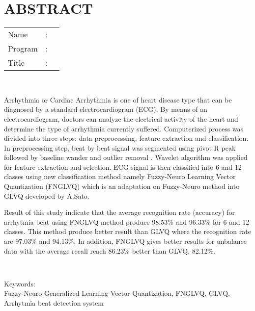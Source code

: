 %
%
%

\chapter*{ABSTRACT}

\vspace*{0.2cm}

\noindent \begin{tabular}{l l p{11.0cm}}
	Name&: & \penulis \\
	Program&: & \programstudi \\
	Title&: & \judulInggris \\
\end{tabular} \\ 

\vspace*{0.5cm}

\noindent
Arrhythmia or Cardiac Arrhythmia is one of heart
disease type that can be diagnosed by a standard electrocardiogram (ECG). By
means of an electrocardiogram, doctors can analyze the electrical activity of
the heart and determine the type of arrhythmia currently suffered. Computerized
process was divided into three steps: data preprocessing, feature extraction and
classification. In preprocessing step, beat by beat signal was segmented using
pivot R peak followed by baseline wander and outlier removal . Wavelet algorithm
was applied for feature extraction and selection. ECG signal is then classified
into 6 and 12 classes using new classification method namely Fuzzy-Neuro
Learning Vector Quantization (FNGLVQ) which is an adaptation on Fuzzy-Neuro
method into GLVQ developed by A.Sato.

Result of this study indicate that the average recognition rate (accuracy) for
arrhytmia beat using FNGLVQ method produce 98.53\% and 96.33\% for 6 and 12
classes. This method produce better result than GLVQ where the recognition rate
are 97.03\% and 94.13\%.  In addition, FNGLVQ gives better results for
unbalance data with the average recall reach 86.23\% better than GLVQ,
82.12\%.
 
\\

\vspace*{0.2cm}

\noindent Keywords: \\ 
\noindent Fuzzy-Neuro Generalized Learning Vector Quantization, FNGLVQ,
GLVQ, Arrhytmia beat detection system\\

\newpage
